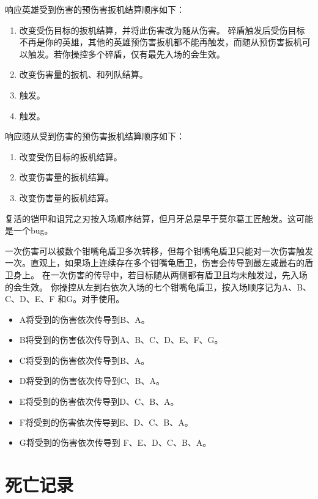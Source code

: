 响应英雄受到伤害的预伤害扳机结算顺序如下：
\begin{enumerate}
    \item 改变受伤目标的扳机结算，并将此伤害改为随从伤害。
        \notice 碎盾触发后受伤目标不再是你的英雄，其他的英雄预伤害扳机都不能再触发，而随从预伤害扳机可以触发。若你操控多个碎盾，仅有最先入场的会生效。
    \item 改变伤害量的扳机、和列队结算。
    \item {}触发。
    \item {}触发。
\end{enumerate}

响应随从受到伤害的预伤害扳机结算顺序如下：
\begin{enumerate}
    \item 改变受伤目标的扳机结算。
    \item 改变伤害量的扳机结算。
    \item 改变伤害量的扳机结算。
\end{enumerate}
\notice 复活的铠甲和诅咒之刃按入场顺序结算，但月牙总是早于莫尔葛工匠触发。这可能是一个bug。

一次伤害可以被数个钳嘴龟盾卫多次转移，但每个钳嘴龟盾卫只能对一次伤害触发一次。直观上，如果场上连续存在多个钳嘴龟盾卫，伤害会传导到最左或最右的盾卫身上。
\notice 在一次伤害的传导中，若目标随从两侧都有盾卫且均未触发过，先入场的会生效。
\example 你操控从左到右依次入场的七个钳嘴龟盾卫，按入场顺序记为A、B、C、D、E、F 和G。对手使用。
\begin{itemize}
    \item A将受到的伤害依次传导到B、A。
    \item B将受到的伤害依次传导到A、B、C、D、E、F、G。
    \item C将受到的伤害依次传导到B、A。
    \item D将受到的伤害依次传导到C、B、A。
    \item E将受到的伤害依次传导到D、C、B、A。
    \item F将受到的伤害依次传导到E、D、C、B、A。
    \item G将受到的伤害依次传导到 F、E、D、C、B、A。
\end{itemize}

\section{死亡记录}

